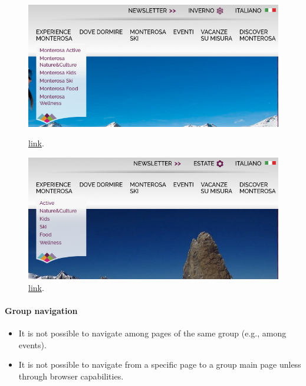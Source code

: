 \documentclass[a4paper, 11pt, parskip=half, headsepline]{scrreprt}
\begin{document}
\begin{figure}[H]
    \begin{minipage}[t]{0.5\textwidth}
        \centering
        \includegraphics[width=1\linewidth, keepaspectratio]{15-interaction-consistency}
        \caption{\href{https://www.visitmonterosa.com}{link}.}
        \label{fig:interaction-consistency-05}
    \end{minipage}   
    \hspace*{\fill}
    \begin{minipage}[t]{0.5\textwidth}
        \centering
        \includegraphics[width=1\linewidth, keepaspectratio]{16-interaction-consistency}
        \caption{\href{https://www.visitmonterosa.com/?season=summer}{link}.}
        \label{fig:interaction-consistency-06}
    \end{minipage} 
\end{figure}

\paragraph{Group navigation}
\begin{itemize}
    \item It is not possible to navigate among pages of the same group (e.g., among events).
    \item It is not possible to navigate from a specific page to a group main page unless through browser capabilities.
\end{itemize}
\end{document}
